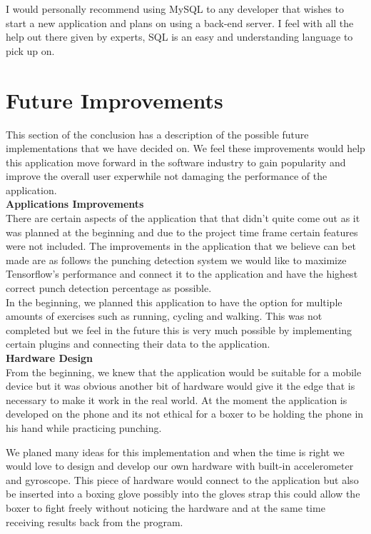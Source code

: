 \documentclass[a4paper,12pt]{report}
\begin{document}
I would personally recommend using MySQL to any developer that wishes to start a new application and plans on using a back-end server. I feel with all the help out there given by experts, SQL is an easy and understanding language to pick up on.

\section{Future Improvements}
This section of the conclusion has a description of the possible future implementations that we have decided on. We feel these improvements would help this application move forward in the software industry to gain popularity and improve the overall user exper\bodyience while not damaging the performance of the application.\\

\textbf{Applications Improvements}\\
There are certain aspects of the application that that didn't quite come out as it was planned at the beginning and due to the project time frame certain features were not included.
The improvements in the application that we believe can bet made are as follows the punching detection system we would like to maximize Tensorflow's performance and connect it to the application and have the highest correct punch detection percentage as possible.\\
In the beginning, we planned this application to have the option for multiple amounts of exercises such as running, cycling and walking. This was not completed but we feel in the future this is very much possible by implementing certain plugins and connecting their data to the application.\\  


\textbf{Hardware Design}\\
From the beginning, we knew that the application would be suitable for a mobile device but it was obvious another bit of hardware would give it the edge that is necessary to make it work in the real world.
At the moment the application is developed on the phone and its not ethical for a boxer to be holding the phone in his hand while practicing punching.

We planed many ideas for this implementation and when the time is right we would love to design and develop our own hardware with built-in accelerometer and gyroscope.
This piece of hardware would connect to the application but also be inserted into a boxing glove possibly into the gloves strap this could allow the boxer to fight freely without noticing the hardware and at the same time receiving results back from the program.\\
\end{document}
